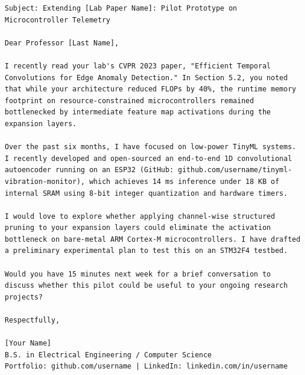 \begin{lstlisting}[style=pythonstyle, caption={High-Impact Faculty Outreach Email Template.}, label={lst:email_template}]
Subject: Extending [Lab Paper Name]: Pilot Prototype on Microcontroller Telemetry

Dear Professor [Last Name],

I recently read your lab's CVPR 2023 paper, "Efficient Temporal Convolutions for Edge Anomaly Detection." In Section 5.2, you noted that while your architecture reduced FLOPs by 40%, the runtime memory footprint on resource-constrained microcontrollers remained bottlenecked by intermediate feature map activations during the expansion layers.

Over the past six months, I have focused on low-power TinyML systems. I recently developed and open-sourced an end-to-end 1D convolutional autoencoder running on an ESP32 (GitHub: github.com/username/tinyml-vibration-monitor), which achieves 14 ms inference under 18 KB of internal SRAM using 8-bit integer quantization and hardware timers.

I would love to explore whether applying channel-wise structured pruning to your expansion layers could eliminate the activation bottleneck on bare-metal ARM Cortex-M microcontrollers. I have drafted a preliminary experimental plan to test this on an STM32F4 testbed.

Would you have 15 minutes next week for a brief conversation to discuss whether this pilot could be useful to your ongoing research projects?

Respectfully,

[Your Name]
B.S. in Electrical Engineering / Computer Science
Portfolio: github.com/username | LinkedIn: linkedin.com/in/username
\end{lstlisting}

